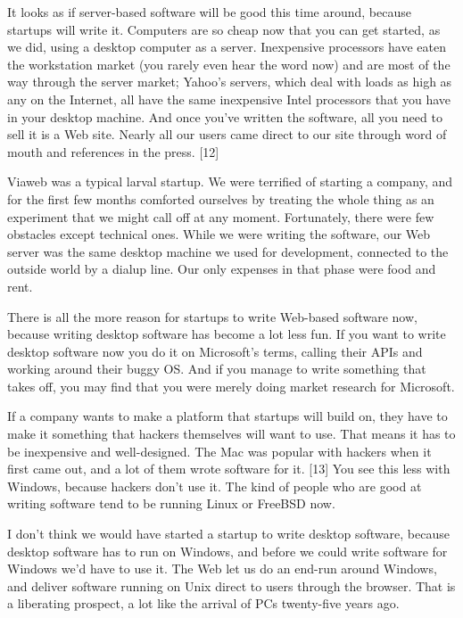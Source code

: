It looks as if server-based software will be good this time around,
because startups will write it. Computers are so cheap now that you can
get started, as we did, using a desktop computer as a server.
Inexpensive processors have eaten the workstation market (you rarely
even hear the word now) and are most of the way through the server
market; Yahoo's servers, which deal with loads as high as any on the
Internet, all have the same inexpensive Intel processors that you have
in your desktop machine. And once you've written the software, all you
need to sell it is a Web site. Nearly all our users came direct to our
site through word of mouth and references in the press. {[}12{]}

Viaweb was a typical larval startup. We were terrified of starting a
company, and for the first few months comforted ourselves by treating
the whole thing as an experiment that we might call off at any moment.
Fortunately, there were few obstacles except technical ones. While we
were writing the software, our Web server was the same desktop machine
we used for development, connected to the outside world by a dialup
line. Our only expenses in that phase were food and rent.

There is all the more reason for startups to write Web-based software
now, because writing desktop software has become a lot less fun. If you
want to write desktop software now you do it on Microsoft's terms,
calling their APIs and working around their buggy OS. And if you manage
to write something that takes off, you may find that you were merely
doing market research for Microsoft.

If a company wants to make a platform that startups will build on, they
have to make it something that hackers themselves will want to use. That
means it has to be inexpensive and well-designed. The Mac was popular
with hackers when it first came out, and a lot of them wrote software
for it. {[}13{]} You see this less with Windows, because hackers don't
use it. The kind of people who are good at writing software tend to be
running Linux or FreeBSD now.

I don't think we would have started a startup to write desktop software,
because desktop software has to run on Windows, and before we could
write software for Windows we'd have to use it. The Web let us do an
end-run around Windows, and deliver software running on Unix direct to
users through the browser. That is a liberating prospect, a lot like the
arrival of PCs twenty-five years ago.

